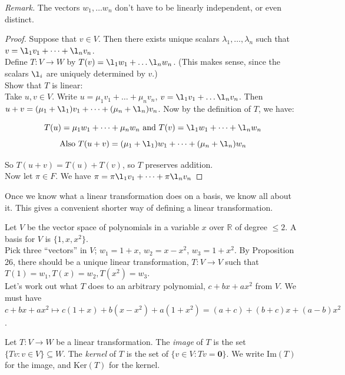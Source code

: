 \documentclass[twoside]{scrartcl}
\begin{document}
\textit{Remark.} The vectors $w_1, \dots w_n$ don't have to be linearly independent, or even distinct.
\begin{proof}
Suppose that $v \in V.$ Then there exists unique scalars $\lambda_1,\dots,\lambda_n$ such that $v = \l_1v_1 + \dots + \l_nv_n$.\\

Define $T: V \to W$ by $T(v) = \l_1w_1 + \dots \l_nw_n$. (This makes sense, since the scalars $\l_i$ are uniquely determined by $v$.)\\

Show that $T$ is linear:\\
Take $u,v \in V$. Write $u = \mu_1v_1 + \dots + \mu_nv_n$, $v = \l_1v_1 + \dots \l_nv_n$. Then $u+v = (\mu_1 + \l_1)v_1 + \dots + (\mu_n + \l_n)v_n$. Now by the definition of $T$, we have:

\[T(u) = \mu_1w_1 + \dots + \mu_nw_n \text{ and }T(v) = \l_1w_1 + \dots + \l_nw_n\]
\[\text{Also }T(u+v) = (\mu_1 + \l_1)w_1 + \dots + (\mu_n + \l_n)w_n\]

So $T(u+v) = T(u) + T(v)$, so $T$ preserves addition.\\

Now let $\pi \in F$. We have $\pi = \pi\l_1v_1 + \dots + \pi\l_nv_n$
\end{proof}

\begin{remark} Once we know what a linear transformation does on a basis, we know all about it. This gives a convenient shorter way of defining a linear transformation. 	
\end{remark}


\begin{example} Let $V$ be the vector space of polynomials in a variable $x$ over $\mathbb{R}$ of degree $\leq 2$. A basis for $V$ is $\{1,x,x^2\}$.\\

Pick three ``vectors'' in $V$; $w_1 = 1+x$, $w_2 = x-x^2$, $w_3 = 1+x^2$. By Proposition 26, there should be a unique linear transformation, $T: V\to V$ such that $T(1) = w_1, T(x) = w_2, T(x^2) = w_3$.\\

Let's work out what $T$ does to an arbitrary polynomial, $c + bx + ax^2$ from $V$. We must have $c + bx + ax^2 \longmapsto c(1+x) + b(x-x^2) + a(1+x^2) = (a+c) + (b+c)x + (a-b)x^2$.
\end{example}

  
 
\begin{definition}   
 Let $T: V \to W$ be a linear transformation. The \emph{image} of $T$ is the set $\{Tv : v\in V\} \subseteq W$. The \emph{kernel} of $T$ is the set of $\{ v \in V: Tv = \mathbf{0} \}$. We write Im$(T)$ for the image, and Ker$(T)$ for the kernel. 
 \end{definition}
\end{document}
